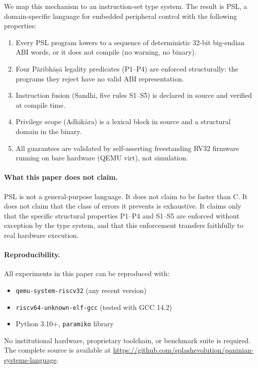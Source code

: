 \documentclass[11pt,a4paper]{article}
\begin{document}
We map this mechanism to an instruction-set type system. The result is PSL,
a domain-specific language for embedded peripheral control with the following
properties:

\begin{enumerate}
\item Every PSL program lowers to a sequence of deterministic 32-bit
  big-endian ABI words, or it does not compile (no warning, no binary).
\item Four P\={a}ribh\={a}\d{s}\={a} legality predicates (P1--P4) are
  enforced structurally: the programs they reject have no valid ABI
  representation.
\item Instruction fusion (Sandhi, five rules S1--S5) is declared in source
  and verified at compile time.
\item Privilege scope (Adhi\-k\={a}ra) is a lexical block in source and a
  structural domain in the binary.
\item All guarantees are validated by self-asserting freestanding RV32 firmware
  running on bare hardware (QEMU virt), not simulation.
\end{enumerate}

\paragraph{What this paper does not claim.}
PSL is not a general-purpose language. It does not claim to be faster than C.
It does not claim that the class of errors it prevents is exhaustive. It claims
only that the specific structural properties P1--P4 and S1--S5 are enforced
without exception by the type system, and that this enforcement transfers
faithfully to real hardware execution.

\paragraph{Reproducibility.}
All experiments in this paper can be reproduced with:
\begin{itemize}
  \item \texttt{qemu-system-riscv32} (any recent version)
  \item \texttt{riscv64-unknown-elf-gcc} (tested with GCC 14.2)
  \item Python 3.10+, \texttt{paramiko} library
\end{itemize}
No institutional hardware, proprietary toolchain, or benchmark suite is
required. The complete source is available at
\url{https://github.com/splashevolution/paninian-systems-language}.
\end{document}

